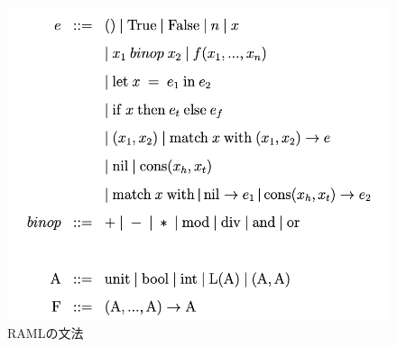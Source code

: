 \documentclass{kuisthesis}
\begin{document}
\begin{figure}[ht]
  \begin{center}
    \includegraphics[scale=0.8]{image1.png}
    \caption{RAMLの文法}
    \label{image1}
  \end{center}
\end{figure}

\end{document}
